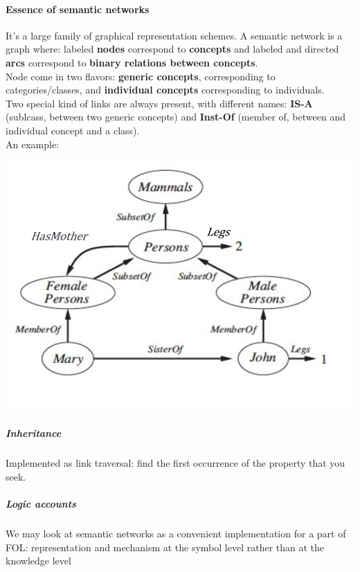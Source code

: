 \documentclass[10pt]{report}
\begin{document}
\paragraph{Essence of semantic networks} It's a large family of graphical representation schemes. A semantic network is a graph where: labeled \textbf{nodes} correspond to \textbf{concepts} and labeled and directed \textbf{arcs} correspond to \textbf{binary relations between concepts}.\\
Node come in two flavors: \textbf{generic concepts}, corresponding to categories/classes, and \textbf{individual concepts} corresponding to individuals.\\
Two special kind of links are always present, with different names: \textbf{IS-A} (sublcass, between two generic concepts) and \textbf{Inst-Of} (member of, between and individual concept and a class).\\
An example:
\begin{center}
	\includegraphics[scale=0.5]{17.png}
\end{center}
\subparagraph{Inheritance} Implemented as link traversal: find the first occurrence of the property that you seek.
\subparagraph{Logic accounts} We may look at semantic networks as a convenient implementation for a part of FOL: representation and mechanism at the symbol level rather than at the knowledge level
\end{document}
